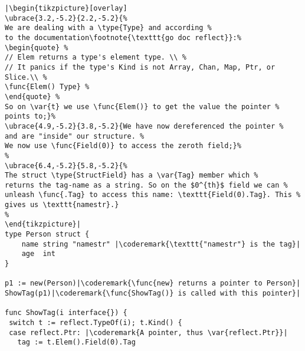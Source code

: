 \begin{lstlisting}[caption=Introspection using reflection,label=src:introspection]
|\begin{tikzpicture}[overlay]
\ubrace{3.2,-5.2}{2.2,-5.2}{%
We are dealing with a \type{Type} and according %
to the documentation\footnote{\texttt{go doc reflect}}:%
\begin{quote} %
// Elem returns a type's element type. \\ %
// It panics if the type's Kind is not Array, Chan, Map, Ptr, or Slice.\\ %
\func{Elem() Type} %
\end{quote} %
So on \var{t} we use \func{Elem()} to get the value the pointer %
points to;}%
\ubrace{4.9,-5.2}{3.8,-5.2}{We have now dereferenced the pointer %
and are "inside" our structure. %
We now use \func{Field(0)} to access the zeroth field;}%
%
\ubrace{6.4,-5.2}{5.8,-5.2}{%
The struct \type{StructField} has a \var{Tag} member which %
returns the tag-name as a string. So on the $0^{th}$ field we can %
unleash \func{.Tag} to access this name: \texttt{Field(0).Tag}. This %
gives us \texttt{namestr}.}
%
\end{tikzpicture}|
type Person struct {
    name string "namestr" |\coderemark{\texttt{"namestr"} is the tag}|
    age  int
}

p1 := new(Person)|\coderemark{\func{new} returns a pointer to Person}|
ShowTag(p1)|\coderemark{\func{ShowTag()} is called with this pointer}|

func ShowTag(i interface{}) {
 switch t := reflect.TypeOf(i); t.Kind() {
 case reflect.Ptr: |\coderemark{A pointer, thus \var{reflect.Ptr}}|
   tag := t.Elem().Field(0).Tag
\end{lstlisting}
